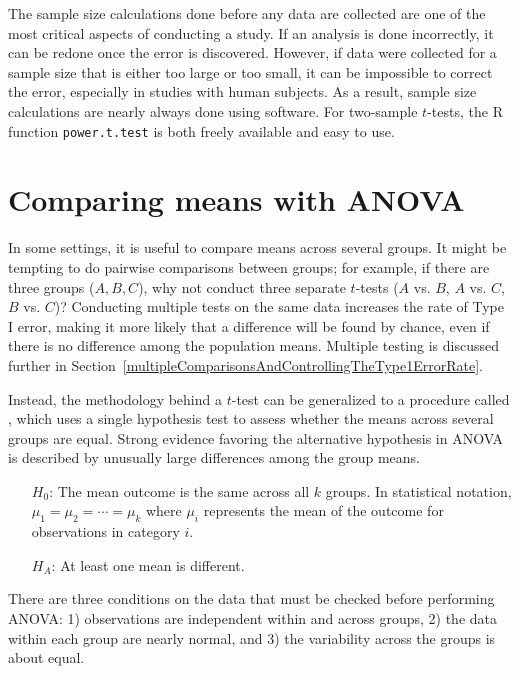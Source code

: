 The sample size calculations done before any data are collected are one of the most critical aspects of conducting a study. If an analysis is done incorrectly, it can be redone once the error is discovered. However, if data were collected for a sample size that is either too large or too small, it can be impossible to correct the error, especially in studies with human subjects. As a result, sample size calculations are nearly always done using software. For two-sample $t$-tests, the \textsf{R} function \texttt{power.t.test} is both freely available and easy to use.


\section{Comparing means with ANOVA}
\label{anovaAndRegrWithCategoricalVariables}


In some settings, it is useful to compare means across several groups. It might be tempting to do pairwise comparisons between groups; for example, if there are three groups ($A, B, C$), why not conduct three separate $t$-tests ($A$ vs. $B$, $A$ vs. $C$, $B$ vs. $C$)? Conducting multiple tests on the same data increases the rate of Type I error, making it more likely that a difference will be found by chance, even if there is no difference among the population means. Multiple testing is discussed further in Section~\ref{multipleComparisonsAndControllingTheType1ErrorRate}.

Instead, the methodology behind a $t$-test can be generalized to a procedure called , which uses a single hypothesis test to assess whether the means across several groups are equal. Strong evidence favoring the alternative hypothesis in ANOVA is described by unusually large differences among the group means.

\begin{itemize}
	\setlength{\itemsep}{0mm}
	\item[$H_0$:] The mean outcome is the same across all $k$ groups. In statistical notation, $\mu_1 = \mu_2 = \cdots = \mu_k$ where $\mu_i$ represents the mean of the outcome for observations in category $i$.
	\item[$H_A$:] At least one mean is different.
\end{itemize}

There are three conditions on the data that must be checked before performing ANOVA: 1) observations are independent within and across groups, 2) the data within each group are nearly normal, and 3) the variability across the groups is about equal.

